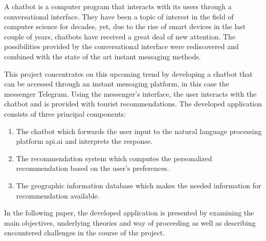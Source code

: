 
A chatbot is a computer program that interacts with its users through a conversational interface. They have been a topic of interest in the field of computer science for decades, yet, due to the rise of smart devices in the last couple of years, chatbots have received a great deal of new attention. The possibilities provided by the conversational interface were rediscovered and combined with the state of the art instant messaging methods. 

This project concentrates on this upcoming trend by developing a chatbot that can be accessed through an instant messaging platform, in this case the messenger Telegram. Using the messenger’s interface, the user interacts with the chatbot and is provided with tourist recommendations. The developed application consists of three principal components: 

\begin{enumerate}
\item The chatbot which forwards the user input to the natural language processing platform api.ai and interprets the response.
\item The recommendation system which computes the personalized recommendation based on the user’s preferences.
\item The geographic information database which makes the needed information for recommendation available.
\end{enumerate}

In the following paper, the developed application is presented by examining the main objectives, underlying theories and way of proceeding as well as describing encountered challenges in the course of the project. 
